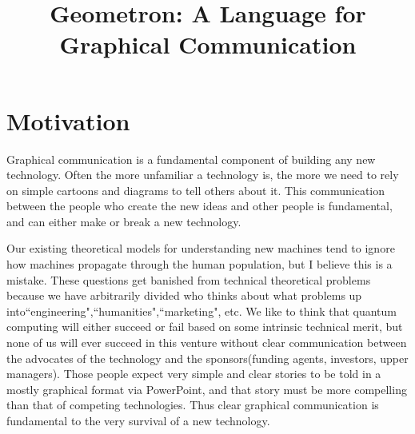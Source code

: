 \documentclass[11pt]{article}
\begin{document}
\title{Geometron: A Language for Graphical Communication}



\section{Motivation}

    Graphical communication is a fundamental component of building any new technology.  Often the more unfamiliar a technology is, the more we need to rely on simple cartoons and diagrams to tell others about it.  This communication between the people who create the new ideas and other people is fundamental, and can either make or break a new technology.   

    Our existing theoretical models for understanding new machines tend to ignore how machines propagate through the human population, but I believe this is a mistake.  These questions get banished from technical theoretical problems because we have arbitrarily divided who thinks about what problems up into``engineering",``humanities",``marketing", etc.  We like to think that quantum computing will either succeed or fail based on some intrinsic technical merit, but none of us will ever succeed in this venture without clear communication between the advocates of the technology and the sponsors(funding agents, investors, upper managers).  Those people expect very simple and clear stories to be told in a mostly graphical format via PowerPoint, and that story must be more compelling than that of competing technologies.  Thus clear graphical communication is fundamental to the very survival of a new technology.  
\end{document}

